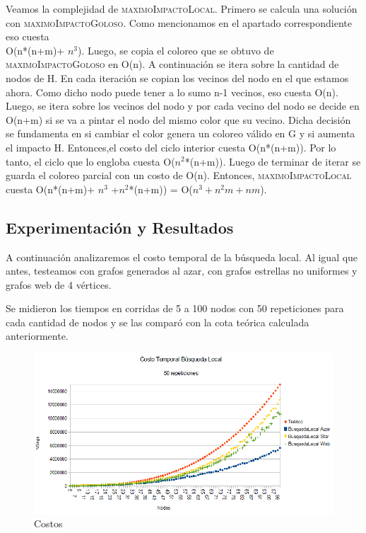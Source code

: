 \indent Veamos la complejidad de \textsc{maximoImpactoLocal}. Primero se calcula una solución con \textsc{maximoImpactoGoloso}. 
Como mencionamos en el apartado correspondiente eso cuesta \\O(n*(n+m)+ $n^{3}$). Luego, se copia el coloreo que se obtuvo de \textsc{maximoImpactoGoloso} en O(n).
A continuación se itera sobre la cantidad de nodos de H. En cada iteración se copian los vecinos del nodo en el que estamos ahora. Como dicho nodo puede tener a lo sumo n-1 vecinos, eso cuesta O(n). Luego, se itera sobre los vecinos del nodo y por cada vecino del nodo se decide en O(n+m) si se va a pintar el nodo del mismo color que su vecino. Dicha decisión se fundamenta en si cambiar el color genera un coloreo válido en G y si aumenta el impacto H. Entonces,el costo del ciclo interior cuesta O(n*(n+m)). Por lo tanto, el ciclo que lo engloba cuesta O($n^{2}$*(n+m)).
 Luego de terminar de iterar se guarda el coloreo parcial con un costo de O(n).
 Entonces, \textsc{maximoImpactoLocal} cuesta O(n*(n+m)+ $n^{3}$ +$ n^{2}$*(n+m)) = O($n^{3} + n^{2}m + nm$).\\

\subsection{Experimentación y Resultados}

\quad A continuación analizaremos el costo temporal de la búsqueda local. Al igual que antes, testeamos con grafos generados al azar, con grafos estrellas no uniformes y grafos web de 4 vértices.

\quad Se midieron los tiempos en corridas de  5 a 100 nodos con 50 repeticiones para cada cantidad de nodos y se las comparó con la cota teórica calculada anteriormente.


\begin{figure}[H]
	\centering
	\includegraphics[scale=0.6]{timingBLocal.png}
\caption{Costos}
\end{figure}

